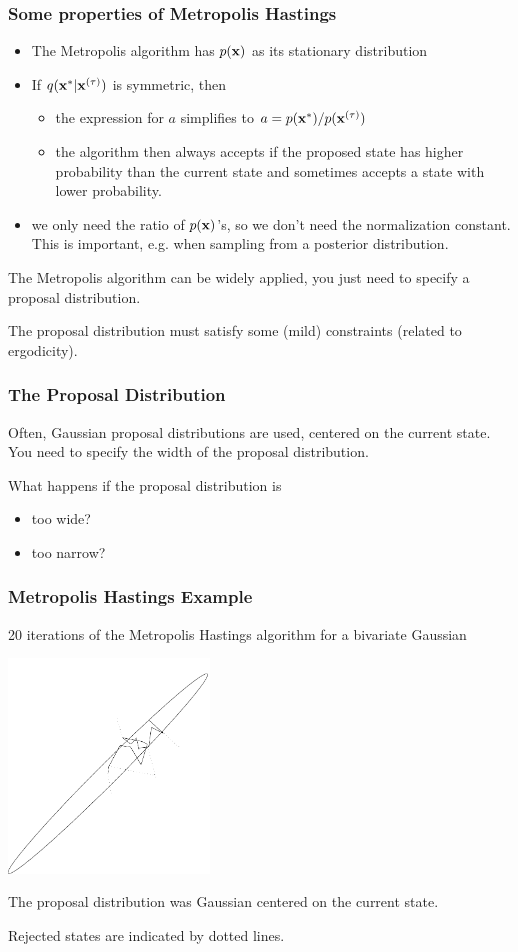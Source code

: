 \begin{frame}
\frametitle{Some properties of Metropolis Hastings}

\begin{itemize}
\item The Metropolis algorithm has $p(\mathbf x)$ as its stationary distribution
\item If $q(\mathbf x^*|\mathbf x^{(\tau)})$ is symmetric, then
  \begin{itemize}
\item the expression for $a$ simplifies to
    $a=p(\mathbf x^*)/p(\mathbf x^{(\tau)})$
\item the algorithm then always accepts if the proposed state has higher
probability than the current state and sometimes accepts a state with
lower probability.
\end{itemize}
\item  we only need the ratio of $p(\mathbf x)$'s, so we don't need the
normalization constant. This is important, e.g. when sampling from a 
posterior distribution.
\end{itemize}

The Metropolis algorithm can be widely applied, you just need to specify 
a proposal distribution.

The proposal distribution must satisfy some (mild) constraints
(related to ergodicity).

\end{frame}

\begin{frame}
\frametitle{The Proposal Distribution}

Often, Gaussian proposal distributions are used, centered on the current state.
You need to specify the width of the proposal distribution.

What happens if the proposal distribution is
\begin{itemize}
\item too wide?
\item too narrow?
\end{itemize}
\end{frame}

\begin{frame}
\frametitle{Metropolis Hastings Example}

20 iterations of the Metropolis Hastings algorithm for a bivariate Gaussian
\begin{center}
\includegraphics[width=0.4\textwidth]{bvg-metrop}
\end{center}
The proposal distribution was Gaussian centered on the current state.

Rejected states are indicated by dotted lines.
\end{frame}


